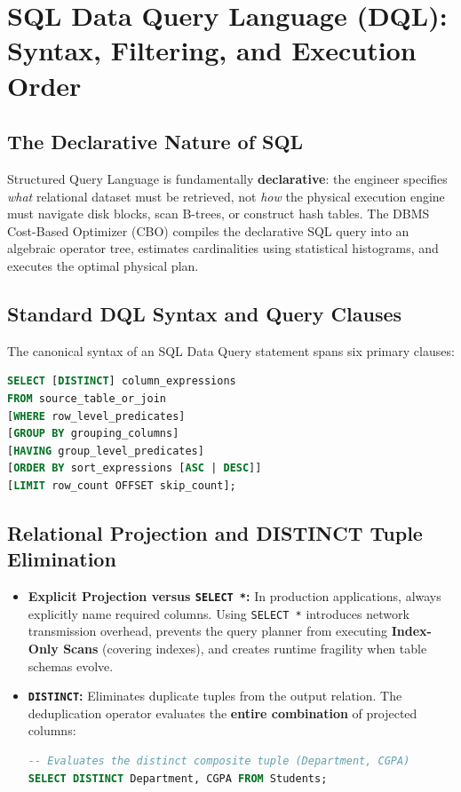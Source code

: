 \section{SQL Data Query Language (DQL): Syntax, Filtering, and Execution Order}
\label{sec:dbms_sql_dql}

\subsection{The Declarative Nature of SQL}
Structured Query Language is fundamentally \textbf{declarative}: the engineer specifies \textit{what} relational dataset must be retrieved, not \textit{how} the physical execution engine must navigate disk blocks, scan B-trees, or construct hash tables. The DBMS Cost-Based Optimizer (CBO) compiles the declarative SQL query into an algebraic operator tree, estimates cardinalities using statistical histograms, and executes the optimal physical plan.

\subsection{Standard DQL Syntax and Query Clauses}
The canonical syntax of an SQL Data Query statement spans six primary clauses:
\begin{lstlisting}[language=SQL]
SELECT [DISTINCT] column_expressions
FROM source_table_or_join
[WHERE row_level_predicates]
[GROUP BY grouping_columns]
[HAVING group_level_predicates]
[ORDER BY sort_expressions [ASC | DESC]]
[LIMIT row_count OFFSET skip_count];
\end{lstlisting}

\subsection{Relational Projection and DISTINCT Tuple Elimination}
\begin{itemize}
    \item \textbf{Explicit Projection versus \texttt{SELECT *}:} In production applications, always explicitly name required columns. Using \texttt{SELECT *} introduces network transmission overhead, prevents the query planner from executing \textbf{Index-Only Scans} (covering indexes), and creates runtime fragility when table schemas evolve.
    \item \textbf{\texttt{DISTINCT}:} Eliminates duplicate tuples from the output relation. The deduplication operator evaluates the \textbf{entire combination} of projected columns:
\begin{lstlisting}[language=SQL]
-- Evaluates the distinct composite tuple (Department, CGPA)
SELECT DISTINCT Department, CGPA FROM Students;
\end{lstlisting}
\end{itemize}

